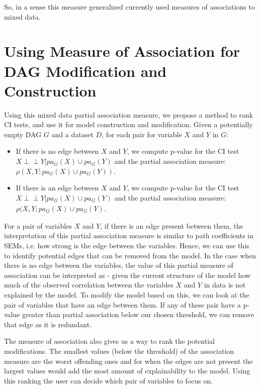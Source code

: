 \documentclass{uai2025} %
\def\ci{\perp\!\!\!\!\!\perp}
\begin{document}
So, in a sense this measure generalized currently used measures of associations
to mixed data.

\section{Using Measure of Association for DAG Modification and Construction}
\label{sec:modification}

Using this mixed data partial association measure, we propose a method to rank
CI tests, and use it for model construction and modification. Given a
potentially empty DAG $ G $ and a dataset $ D $, for each pair for variable $ X
$ and $ Y $ in $ G $:
\begin{itemize}
	\item If there is no edge between $ X $ and $ Y $, we compute p-value for the CI test $ X \ci Y \rvert pa_G(X) \cup pa_G(Y) $ and the partial association measure: $ \rho(X, Y; pa_G(X) \cup pa_G(Y)) $.
	\item If there is an edge between $ X $ and $ Y $, we compute p-value for the CI test $ X \ci Y \rvert pa_{\underline{G}}(X) \cup pa_{\underline{G}}(Y) $ and the partial association measure: $ \rho(X, Y; pa_{\underline{G}}(X) \cup pa_{\underline{G}}(Y) $.
\end{itemize}

For a pair of variables $ X $ and $ Y $, if there is an edge present between
them, the interpretation of this partial association measure is similar to path
coefficients in SEMs, i.e. how strong is the edge between the variables. Hence,
we can use this to identify potential edges that can be removed from the model.
In the case when there is no edge between the variables, the value of this
partial measure of association can be interpreted as - given the current
structure of the model how much of the observed correlation between the
variables $ X $ and $ Y $ in data is not explained by the model. To modify the
model based on this, we can look at the pair of variables that have an edge
between them. If any of these pair have a p-value greater than partial
association below our chosen threshold, we can remove that edge as it is
redundant.

The measure of association also gives us a way to rank the potential
modifications. The smallest values (below the threshold) of the association
measure are the worst offending ones and for when the edges are not present the
largest values would add the most amount of explainability to the model. Using
this ranking the user can decide which pair of variables to focus on.
\end{document}
